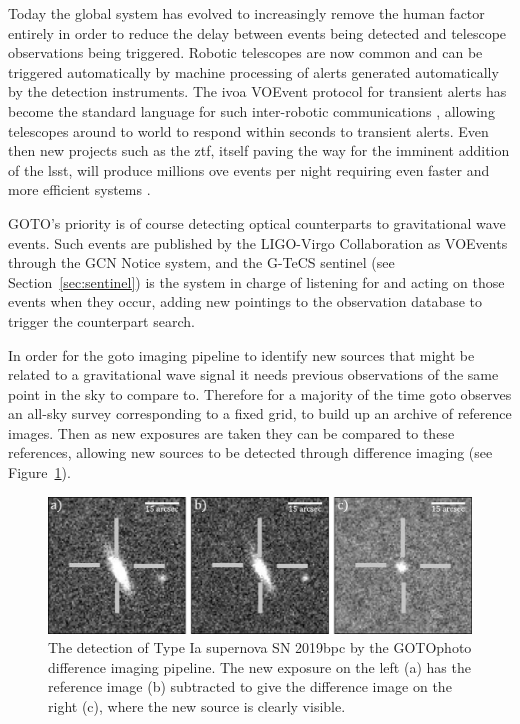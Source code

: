 \begin{colsection}
\begin{colsection}
Today the global system has evolved to increasingly remove the human factor entirely in order to reduce the delay between events being detected and telescope observations being triggered. Robotic telescopes are now common and can be triggered automatically by machine processing of alerts generated automatically by the detection instruments. The \gls{ivoa} VOEvent protocol for transient alerts has become the standard language for such inter-robotic communications \citep{voevent}, allowing telescopes around to world to respond within seconds to transient alerts. Even then new projects such as the \gls{ztf}, itself paving the way for the imminent addition of the \gls{lsst}, will produce millions ove events per night requiring even faster and more efficient systems \citep{ZTF_alerts}.

GOTO's priority is of course detecting optical counterparts to gravitational wave events. Such events are published by the LIGO-Virgo Collaboration as VOEvents through the GCN Notice system, and the G-TeCS sentinel (see Section~\ref{sec:sentinel}) is the system in charge of listening for and acting on those events when they occur, adding new pointings to the observation database to trigger the counterpart search.

In order for the \gls{goto} imaging pipeline to identify new sources that might be related to a gravitational wave signal it needs previous observations of the same point in the sky to compare to. Therefore for a majority of the time \gls{goto} observes an all-sky survey corresponding to a fixed grid, to build up an archive of reference images. Then as new exposures are taken they can be compared to these references, allowing new sources to be detected through difference imaging (see Figure~\ref{fig:difference_imaging}).


\begin{figure}[t]
\includegraphics[width=\linewidth]{images/diffimg.pdf}
\caption[The detection of SN 2019bpc through difference imaging]{The detection of Type Ia supernova SN 2019bpc by the GOTOphoto difference imaging pipeline. The new exposure on the left (a) has the reference image (b) subtracted to give the difference image on the right (c), where the new source is clearly visible.}
\label{fig:difference_imaging}
\end{figure}


\end{colsection}


\end{colsection}


